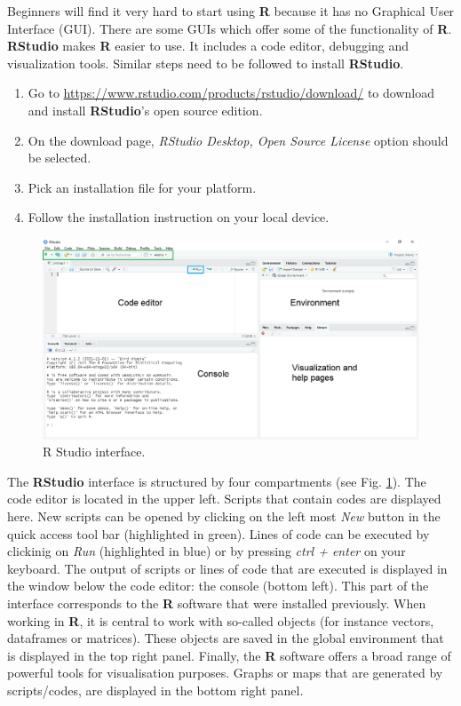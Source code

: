 \documentclass[
  10pt,
  b5paper,
  oneside]{book}
\providecommand{\tightlist}{%
  \setlength{\itemsep}{0pt}\setlength{\parskip}{0pt}}
\begin{document}
Beginners will find it very hard to start using \textbf{R} because it has no Graphical User Interface (GUI). There are some GUIs which offer some of the functionality of \textbf{R}. \textbf{RStudio} makes \textbf{R} easier to use. It includes a code editor, debugging and visualization tools. Similar steps need to be followed to install \textbf{RStudio}.

\begin{enumerate}
\def\labelenumi{\arabic{enumi}.}
\tightlist
\item
  Go to \url{https://www.rstudio.com/products/rstudio/download/} to download and install \textbf{RStudio}'s open source edition.
\item
  On the download page, \emph{RStudio Desktop, Open Source License} option should be selected.
\item
  Pick an installation file for your platform.
\item
  Follow the installation instruction on your local device.
\end{enumerate}

\begin{figure}
\includegraphics[width=18.97in]{images/2_RStudio-interface} \caption{R Studio interface.}\label{fig:Rstudio}
\end{figure}

The \textbf{RStudio} interface is structured by four compartments (see Fig. \ref{fig:Rstudio}). The code editor is located in the upper left. Scripts that contain codes are displayed here. New scripts can be opened by clicking on the left most \emph{New} button in the quick access tool bar (highlighted in green). Lines of code can be executed by clickinig on \emph{Run} (highlighted in blue) or by pressing \emph{ctrl + enter} on your keyboard.
The output of scripts or lines of code that are executed is displayed in the window below the code editor: the console (bottom left). This part of the interface corresponds to the \textbf{R} software that were installed previously.
When working in \textbf{R}, it is central to work with so-called objects (for instance vectors, dataframes or matrices). These objects are saved in the global environment that is displayed in the top right panel.
Finally, the \textbf{R} software offers a broad range of powerful tools for visualisation purposes. Graphs or maps that are generated by scripts/codes, are displayed in the bottom right panel.
\end{document}
